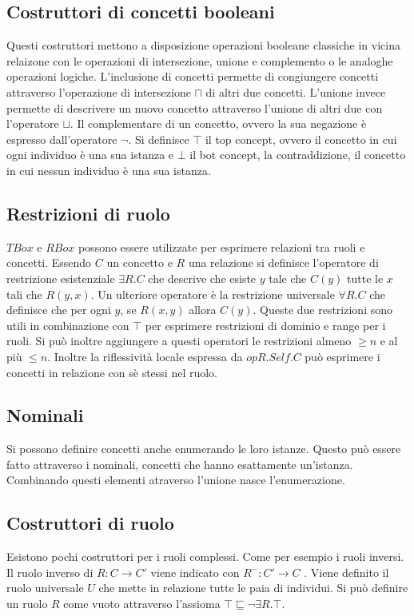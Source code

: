 \subsection{Costruttori di concetti booleani}
Questi costruttori mettono a disposizione operazioni booleane classiche in vicina relaizone con le operazioni di intersezione, unione e complemento o le analoghe operazioni logiche. L'inclusione di concetti 
permette di congiungere concetti attraverso l'operazione di intersezione $\sqcap$ di altri due concetti. L'unione invece permette di descrivere un nuovo concetto attraverso l'unione di altri due con l'operatore
$\sqcup$. Il complementare di un concetto, ovvero la sua negazione \`e espresso dall'operatore $\neg$. Si definisce $\top$ il top concept, ovvero il concetto in cui ogni individuo \`e una sua istanza e $\bot$ il 
bot concept, la contraddizione, il concetto in cui nessun individuo \`e una sua istanza. 
\subsection{Restrizioni di ruolo}
$TBox$ e $RBox$ possono essere utilizzate per esprimere relazioni tra ruoli e concetti. Essendo $C$ un concetto e $R$ una relazione si definisce l'operatore di restrizione esistenziale $\exists R.C$ che 
descrive che esiste $y$ tale che $C(y)$ tutte le $x$ tali che $R(y, x)$. Un ulteriore operatore \`e la restrizione universale $\forall R.C$ che definisce che per ogni $y$, se $R(x,y)$ allora $C(y)$. Queste due
restrizioni sono utili in combinazione con $\top$ per esprimere restrizioni di dominio e range per i ruoli. Si pu\`o inoltre aggiungere a questi operatori le restrizioni almeno $\ge n$ e al pi\`u $\le n$. Inoltre
la riflessivit\`a locale espressa da $op R.Self.C$ pu\`o esprimere i concetti in relazione con s\`e stessi nel ruolo.
\subsection{Nominali}
Si possono definire concetti anche enumerando le loro istanze. Questo pu\`o essere fatto attraverso i nominali, concetti che hanno esattamente un'istanza. Combinando questi elementi atraverso l'unione nasce 
l'enumerazione. 
\subsection{Costruttori di ruolo}
Esistono pochi costruttori per i ruoli complessi. Come per esempio i ruoli inversi. Il ruolo inverso di $R: C\rightarrow C'$ viene indicato con $R^-: C'\rightarrow C$ . Viene definito il ruolo universale $U$ che 
mette in relazione tutte le paia di individui. Si pu\`o definire un ruolo $R$ come vuoto attraverso l'assioma $\top\sqsubseteq\neg\exists R.\top$. 
